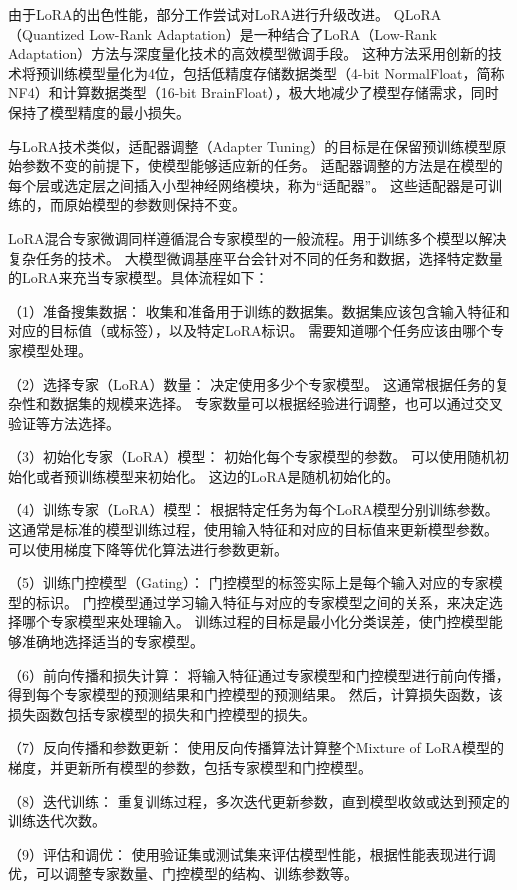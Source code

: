 由于LoRA的出色性能，部分工作尝试对LoRA进行升级改进。
QLoRA（Quantized Low-Rank Adaptation）是一种结合了LoRA（Low-Rank Adaptation）方法与深度量化技术的高效模型微调手段。
这种方法采用创新的技术将预训练模型量化为4位，包括低精度存储数据类型（4-bit NormalFloat，简称NF4）和计算数据类型（16-bit BrainFloat），极大地减少了模型存储需求，同时保持了模型精度的最小损失。

与LoRA技术类似，适配器调整（Adapter Tuning）的目标是在保留预训练模型原始参数不变的前提下，使模型能够适应新的任务。
适配器调整的方法是在模型的每个层或选定层之间插入小型神经网络模块，称为“适配器”。
这些适配器是可训练的，而原始模型的参数则保持不变。

LoRA混合专家微调同样遵循混合专家模型的一般流程。用于训练多个模型以解决复杂任务的技术。
大模型微调基座平台会针对不同的任务和数据，选择特定数量的LoRA来充当专家模型。具体流程如下：

（1）准备搜集数据：
收集和准备用于训练的数据集。数据集应该包含输入特征和对应的目标值（或标签），以及特定LoRA标识。
需要知道哪个任务应该由哪个专家模型处理。

（2）选择专家（LoRA）数量：
决定使用多少个专家模型。
这通常根据任务的复杂性和数据集的规模来选择。
专家数量可以根据经验进行调整，也可以通过交叉验证等方法选择。

（3）初始化专家（LoRA）模型：
初始化每个专家模型的参数。
可以使用随机初始化或者预训练模型来初始化。
这边的LoRA是随机初始化的。

（4）训练专家（LoRA）模型：
根据特定任务为每个LoRA模型分别训练参数。
这通常是标准的模型训练过程，使用输入特征和对应的目标值来更新模型参数。
可以使用梯度下降等优化算法进行参数更新。

（5）训练门控模型（Gating）：
门控模型的标签实际上是每个输入对应的专家模型的标识。
门控模型通过学习输入特征与对应的专家模型之间的关系，来决定选择哪个专家模型来处理输入。
训练过程的目标是最小化分类误差，使门控模型能够准确地选择适当的专家模型。

（6）前向传播和损失计算：
将输入特征通过专家模型和门控模型进行前向传播，得到每个专家模型的预测结果和门控模型的预测结果。
然后，计算损失函数，该损失函数包括专家模型的损失和门控模型的损失。

（7）反向传播和参数更新：
使用反向传播算法计算整个Mixture of LoRA模型的梯度，并更新所有模型的参数，包括专家模型和门控模型。

（8）迭代训练：
重复训练过程，多次迭代更新参数，直到模型收敛或达到预定的训练迭代次数。

（9）评估和调优：
使用验证集或测试集来评估模型性能，根据性能表现进行调优，可以调整专家数量、门控模型的结构、训练参数等。


